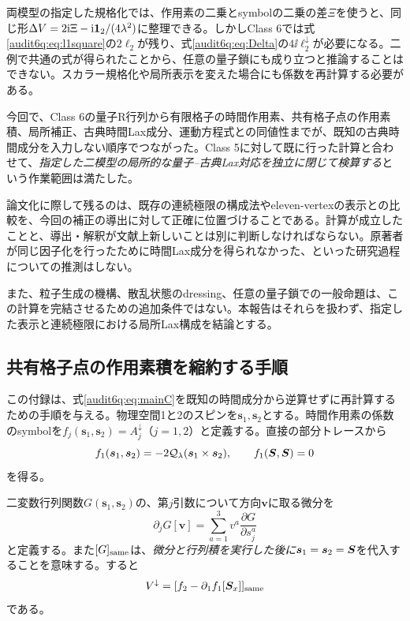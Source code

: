両模型の指定した規格化では、作用素の二乗とsymbolの二乗の差$\Xi$を使うと、同じ形$\Delta V=2\mathrm i\Xi-\mathrm i\mathbf 1_{2}/(4\lambda^2)$に整理できる。しかしClass 6では式\eqref{audit6q:eq:l1square}の$2\ell_2$が残り、式\eqref{audit6q:eq:Delta}の$4\ii\ell_2^\downarrow$が必要になる。二例で共通の式が得られたことから、任意の量子鎖にも成り立つと推論することはできない。スカラー規格化や局所表示を変えた場合にも係数を再計算する必要がある。

今回で、Class 6の量子R行列から有限格子の時間作用素、共有格子点の作用素積、局所補正、古典時間Lax成分、運動方程式との同値性までが、既知の古典時間成分を入力しない順序でつながった。Class 5に対して既に行った計算と合わせて、\emph{指定した二模型の局所的な量子--古典Lax対応を独立に閉じて検算する}という作業範囲は満たした。

論文化に際して残るのは、既存の連続極限の構成法やeleven-vertexの表示との比較を、今回の補正の導出に対して正確に位置づけることである。計算が成立したことと、導出・解釈が文献上新しいことは別に判断しなければならない。原著者が同じ因子化を行ったために時間Lax成分を得られなかった、といった研究過程についての推測はしない。

また、粒子生成の機構、散乱状態のdressing、任意の量子鎖での一般命題は、この計算を完結させるための追加条件ではない。本報告はそれらを扱わず、指定した表示と連続極限における局所Lax構成を結論とする。

\subsection{共有格子点の作用素積を縮約する手順}
\label{audit6q:app:contraction}
この付録は、式\eqref{audit6q:eq:mainC}を既知の時間成分から逆算せずに再計算するための手順を与える。物理空間1と2のスピンを$\boldsymbol s_1,\boldsymbol s_2$とする。時間作用素の係数のsymbolを$f_j(\boldsymbol s_1,\boldsymbol s_2)=A_j^\downarrow$（$j=1,2$）と定義する。直接の部分トレースから
\begin{equation}
f_1(\boldsymbol s_1,\boldsymbol s_2)=-2\mathcal Q_{\lambda}(\boldsymbol s_1\times\boldsymbol s_2),
\qquad f_1(\boldsymbol S,\boldsymbol S)=0
\label{audit6q:eq:f1}
\end{equation}
を得る。

二変数行列関数$G(\boldsymbol s_1,\boldsymbol s_2)$の、第$j$引数について方向$\boldsymbol v$に取る微分を
\begin{equation}
\partial_jG[\boldsymbol v]
=\sum_{a=1}^3v^a\frac{\partial G}{\partial s_j^a}
\label{audit6q:eq:directional}
\end{equation}
と定義する。また$[G]_{\rm same}$は、\emph{微分と行列積を実行した後に}$\boldsymbol s_1=\boldsymbol s_2=\boldsymbol S$を代入することを意味する。すると
\begin{equation}
V^\downarrow=[f_2-\partial_1f_1[\boldsymbol S_x]]_{\rm same}
\label{audit6q:eq:Vdownextraction}
\end{equation}
である。

